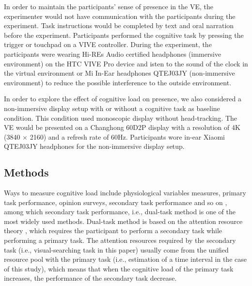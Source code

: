 \documentclass[sigconf]{acmart}
\begin{document}
In order to maintain the participants' sense of presence in the VE, the experimenter would not have communication with the participants during the experiment. Task instructions would be completed by text and oral narration before the experiment. Participants performed the cognitive task by pressing the trigger or touchpad on a VIVE controller. During the experiment, the participants were wearing Hi-REs Audio certified headphones (immersive environment) on the HTC VIVE Pro device and isten to the sound of the clock in the virtual environment or Mi In-Ear headphones QTEJ03JY (non-immersive environment) to reduce the possible interference to the outside environment.


In order to explore the effect of cognitive load on presence, we also considered a non-immersive display setup with or without a cognitive task as baseline condition. This condition used monoscopic display without head-tracking. The VE would be presented on a Changhong 60D2P display with a resolution of 4K (3840 $\times$ 2160) and a refresh rate of 60Hz. Participants wore in-ear Xiaomi QTEJ03JY headphones for the non-immersive display setup.

\subsection{Methods}\label{sec:methods}


Ways to measure cognitive load include physiological variables measures, primary task performance, opinion surveys, secondary task performance and so on \cite{block2010cognitive}, among which secondary task performance, i.e., dual-task method is one of the most widely used methods. Dual-task method is based on the attention resource theory \cite{kahneman1973attention,navon1979economy%
}, which requires the participant to perform a secondary task while performing a primary task. The attention resources required by the secondary task (i.e., visual-searching task in this paper) usually come from the unified resource pool with the primary task (i.e., estimation of a time interval in the case of this study), which means that when the cognitive load of the primary task increases, the performance of the secondary task decrease.
\end{document}
